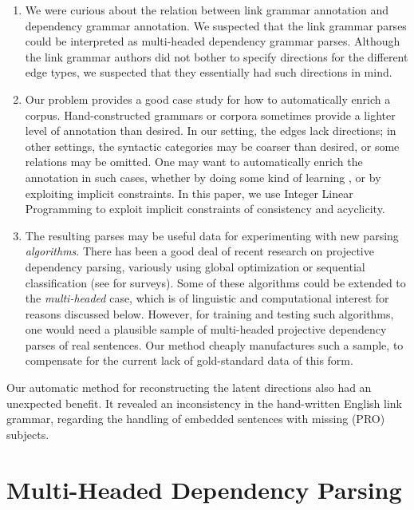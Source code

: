 \documentclass[a4paper,11pt]{article}
\begin{document}
\begin{enumerate}

\item We were curious about the relation between link grammar annotation and dependency grammar annotation.  We suspected that the link grammar parses could be interpreted as multi-headed dependency grammar parses.  Although the link grammar authors did not bother to specify directions for the different edge types, we suspected that they essentially had such directions in mind.  

\item Our problem provides a good case study for how to automatically enrich a corpus.  Hand-constructed grammars or corpora sometimes provide a lighter level of annotation than desired.  In our setting, the edges lack directions; in other settings, the syntactic categories may be coarser than desired, or some relations may be omitted.  One may want to automatically enrich the annotation in such cases, whether by doing some kind of learning \cite[et seq.]{matsuzaki-et-al-2005}, or by exploiting implicit constraints.  In this paper, we use Integer Linear Programming to exploit implicit constraints of consistency and acyclicity.

\item The resulting parses may be useful data for experimenting with new parsing {\em algorithms}.  There has been a good deal of recent research on projective dependency parsing, variously using global optimization or sequential classification (see \cite{martins-et-al-2008,bohnet-2011,chen-li-zhang-2014} for surveys). Some of these algorithms could be extended to the {\em multi-headed} case, which is of linguistic and computational interest for reasons discussed below.  However, for training and testing such algorithms, one would need a plausible sample of multi-headed projective dependency parses of real sentences.  Our method cheaply manufactures such a sample, to compensate for the current lack of gold-standard data of this form.

\end{enumerate}

\noindent Our automatic method for reconstructing the latent directions also had an unexpected benefit.  It revealed an inconsistency in the hand-written English link grammar, regarding the handling of embedded sentences with missing (PRO) subjects.  

\section{Multi-Headed Dependency Parsing}
\end{document}
